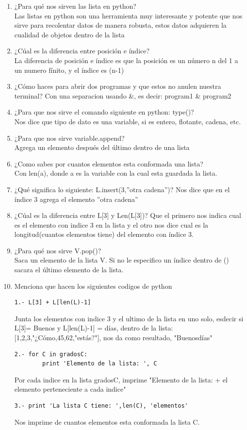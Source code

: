 \documentclass[letterpaper, 12pt, oneside]{article}%
\begin{document}
\begin{enumerate}
	\item ¿Para qué nos sirven las lista en python?\\
	Las listas en python son una herramienta muy interesante y potente que nos sirve para recolentar datos de manera robusta, estos datos adquieren la cualidad de objetos dentro de la lista
	\item ¿Cúal es la diferencia entre posición e índice?\\
	La diferencia de posición e índice es que la posición es un número n del 1 a un numero fínito, y el índice es (n-1)
	\item ¿Cómo haces para abrir dos programas y que estos no anulen nuestra terminal?
	Con una separacion usando \&, es decir: program1 \& program2
	\item ¿Para que nos sirve el comando siguiente en python: type()?\\
	Nos dice que tipo de dato es una variable, si es entero, flotante, cadena, etc.
	\item ¿Para que nos sirve variable.append?\\
	Agrega un elemento después del último dentro de una lista
	\item ¿Como sabes por cuantos elementos esta conformada una lista?\\
	Con len(a), donde a es la variable con la cual esta guardada la lista.
	\item ¿Qué significa lo siguiente: L.insert(3,”otra cadena”)?
	Nos dice que en el índice 3 agrega el elemento ”otra cadena”
	\item ¿Cúal es la diferencia entre L[3] y Len(L[3])?
	Que el primero nos indica cual es el elemento con indice 3 en la lista y el otro nos dice cual es la longitud(cuantos elementos tiene) del elemento con índice 3.
	\item ¿Para qué nos sirve V.pop()?\\
	Saca un elemento de la lista V. Si no le especifico un índice dentro de () sacara el último elemento de la lista.
	\newpage
	\item Menciona que hacen los siguientes codigos de python
	\begin{verbatim}
1.- L[3] + L[len(L)-1] 
	\end{verbatim}
	Junta los elementos con indice 3 y el ultimo de la lista en uno solo, esdecir si L[3]= Buenos y L[len(L)-1] = días, dentro de la lista:
	 [1,2,3,"¿Cómo,45,62,"estás?"], nos da como resultado, "Buenosdías"
	\begin{verbatim}
2.- for C in gradosC:
        print 'Elemento de la lista: ', C
	\end{verbatim}
	Por cada indice en la lista gradosC, imprime "Elemento de la lista: + el elemento perteneciente a cada indice" 
	\begin{verbatim}
3.- print 'La lista C tiene: ',len(C), 'elementos'
	\end{verbatim}
		Nos imprime de cuantos elementos esta conformada la lista C.
	
	
\end{enumerate}%
\end{document}
